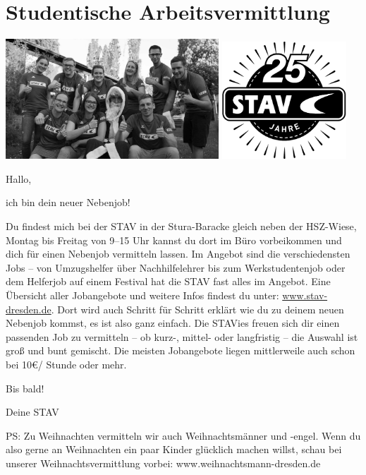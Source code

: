 \section*{Studentische Arbeitsvermittlung}
\label{sec:studentische_arbeitsvermittlung}
\includegraphics[width=0.6\textwidth]{./stav-gruppenbild-gray.jpg}
\hfill
\includegraphics[width=0.35\textwidth]{./stav-logo-bw.jpg}

Hallo,

ich bin dein neuer Nebenjob! 

Du findest mich bei der STAV in der Stura-Baracke gleich neben der HSZ-Wiese,
Montag bis Freitag von 9--15 Uhr kannst du dort im Büro vorbeikommen und
dich für einen Nebenjob vermitteln lassen.
Im Angebot sind die verschiedensten Jobs -- von Umzugshelfer über Nachhilfelehrer
bis zum Werkstudentenjob oder dem Helferjob auf einem Festival hat die STAV fast alles im Angebot.
Eine Übersicht aller Jobangebote und weitere Infos findest du unter:
\url{www.stav-dresden.de}.
Dort wird auch Schritt für Schritt erklärt wie du zu deinem neuen Nebenjob kommst,
es ist also ganz einfach.
Die STAVies freuen sich dir einen passenden Job zu vermitteln – ob kurz-, mittel- oder
langfristig – die Auswahl ist groß und bunt gemischt.
Die meisten Jobangebote liegen mittlerweile auch schon bei 10€/ Stunde oder mehr.

Bis bald!

Deine STAV

PS: Zu Weihnachten vermitteln wir auch Weihnachtsmänner und -engel.
Wenn du also gerne an Weihnachten ein paar Kinder glücklich machen willst,
schau bei unserer Weihnachtsvermittlung vorbei: www.weihnachtsmann-dresden.de





